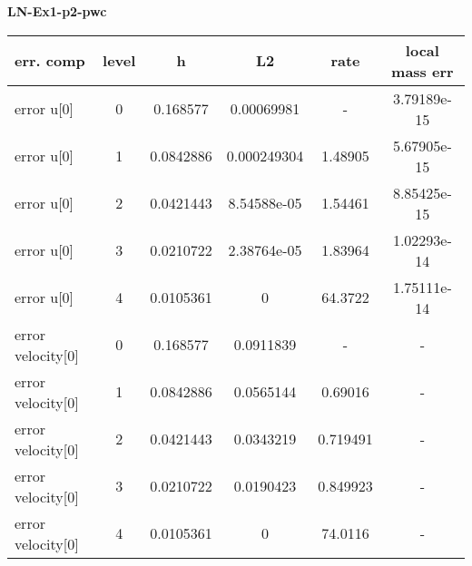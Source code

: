 \documentclass{amsart}
\begin{document}
\begin{center}   
{\bf LN-Ex1-p2-pwc }\end{center}  
\tableofcontents

\begin{table}[h!]
\begin{tabular}{|l|c|c|c|c|c|}
\hline
err. comp & level & h  & L2 & rate  & local mass err \\ 
\hline
error u[0] & 0 & 0.168577  & 0.00069981 & -   &  3.79189e-15 \\ 
error u[0] & 1 & 0.0842886 & 0.000249304 & 1.48905   &  5.67905e-15 \\ 
error u[0] & 2 & 0.0421443 & 8.54588e-05 & 1.54461   &  8.85425e-15 \\ 
error u[0] & 3 & 0.0210722 & 2.38764e-05 & 1.83964   &  1.02293e-14 \\ 
error u[0] & 4 & 0.0105361 & 0 & 64.3722   &  1.75111e-14 \\ 
error velocity[0] & 0 & 0.168577  & 0.0911839 & -   & - \\ 
error velocity[0] & 1 & 0.0842886 & 0.0565144 & 0.69016   & - \\ 
error velocity[0] & 2 & 0.0421443 & 0.0343219 & 0.719491   & - \\ 
error velocity[0] & 3 & 0.0210722 & 0.0190423 & 0.849923   & - \\ 
error velocity[0] & 4 & 0.0105361 & 0 & 74.0116   & - \\ 

\hline
\end{tabular}
\end{table}
\end{document}
